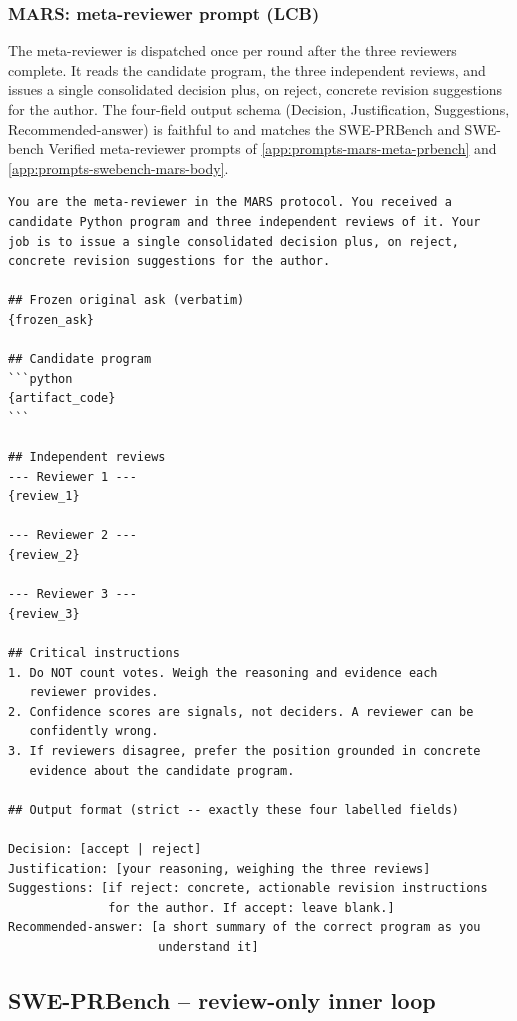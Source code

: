 \documentclass{article}
\begin{document}
\subsubsection{MARS: meta-reviewer prompt (LCB)}
\label{app:prompts-mars-meta-lcb}

The meta-reviewer is dispatched once per round after the three
reviewers complete. It reads the candidate program, the three
independent reviews, and issues a single consolidated decision plus,
on reject, concrete revision suggestions for the author. The
four-field output schema (Decision, Justification, Suggestions,
Recommended-answer) is faithful to \citet{mars2025} and matches the
SWE-PRBench and SWE-bench Verified meta-reviewer prompts of
\autoref{app:prompts-mars-meta-prbench} and
\autoref{app:prompts-swebench-mars-body}.

\begin{footnotesize}
\begin{verbatim}
You are the meta-reviewer in the MARS protocol. You received a
candidate Python program and three independent reviews of it. Your
job is to issue a single consolidated decision plus, on reject,
concrete revision suggestions for the author.

## Frozen original ask (verbatim)
{frozen_ask}

## Candidate program
```python
{artifact_code}
```

## Independent reviews
--- Reviewer 1 ---
{review_1}

--- Reviewer 2 ---
{review_2}

--- Reviewer 3 ---
{review_3}

## Critical instructions
1. Do NOT count votes. Weigh the reasoning and evidence each
   reviewer provides.
2. Confidence scores are signals, not deciders. A reviewer can be
   confidently wrong.
3. If reviewers disagree, prefer the position grounded in concrete
   evidence about the candidate program.

## Output format (strict -- exactly these four labelled fields)

Decision: [accept | reject]
Justification: [your reasoning, weighing the three reviews]
Suggestions: [if reject: concrete, actionable revision instructions
              for the author. If accept: leave blank.]
Recommended-answer: [a short summary of the correct program as you
                     understand it]
\end{verbatim}
\end{footnotesize}

\subsection{SWE-PRBench -- review-only inner loop}
\label{app:prompts-prbench}
\end{document}
